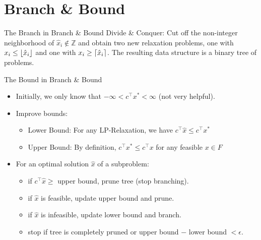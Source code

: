 \section{Branch \& Bound}

\begin{frame}{The Branch in Branch \& Bound}
Divide \& Conquer: Cut off the non-integer neighborhood of $\hat{x}_i \notin \mathbb{Z}$ and obtain two new relaxation problems, one with $x_i \leq \lfloor\hat{x}_i\rfloor$ and one with $x_i \geq \lceil\hat{x}_i\rceil$. The resulting data structure is a binary tree of problems.

\begin{figure}[b]
\centering

\end{figure}

\end{frame}

\begin{frame}{The Bound in Branch \& Bound}
\begin{itemize}
\item Initially, we only know that $-\infty < c^\top x^* < \infty$ (not very helpful).
\item Improve bounds:
\begin{itemize}
\item Lower Bound: For any LP-Relaxation, we have $c^\top \hat{x} \leq c^\top x^*$
\item Upper Bound: By definition, $c^\top x^* \leq c^\top x$ for any feasible $x \in F$
\end{itemize}
\item For an optimal solution $\hat{x}$ of a subproblem:
\begin{itemize}
\item if $c^\top \hat{x} \geq $ upper bound, prune tree (stop branching).
\item if $\hat{x}$ is feasible, update upper bound and prune.
\item if $\hat{x}$ is infeasible, update lower bound and branch.
\item stop if tree is completely pruned or upper bound $-$ lower bound $< \epsilon$.
\end{itemize}

\end{itemize}
\end{frame}

